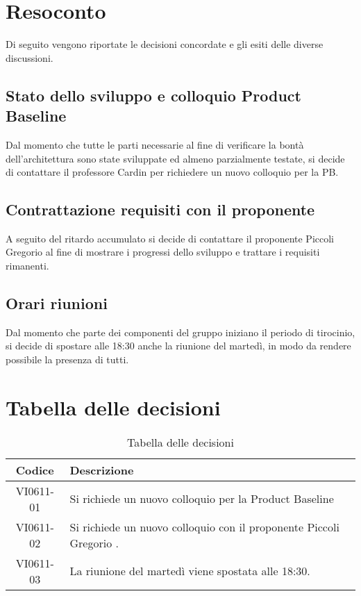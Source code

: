 \documentclass{article}
\begin{document}
\newpage
\section{Resoconto}
\label{sec:resoconto}

Di seguito vengono riportate le decisioni concordate e gli esiti delle diverse discussioni.

\subsection{Stato dello sviluppo e colloquio Product Baseline}
\label{itm:1}
Dal momento che tutte le parti necessarie al fine di verificare la bontà dell'architettura sono state sviluppate ed almeno parzialmente testate, si decide di contattare il professore Cardin per richiedere un nuovo colloquio per la PB.

\subsection{Contrattazione requisiti con il proponente}
\label{itm:2}
A seguito del ritardo accumulato si decide di contattare il proponente Piccoli Gregorio al fine di mostrare i progressi dello sviluppo e trattare i requisiti rimanenti.

\subsection{Orari riunioni}
\label{itm:3}
Dal momento che parte dei componenti del gruppo iniziano il periodo di tirocinio, si decide di spostare alle 18:30 anche la riunione del martedì, in modo da rendere possibile la presenza di tutti.


\section{Tabella delle decisioni}%
\label{sub:decisioni}

\begin{table}[!ht]
	\centering
	\begin{tabular}{|c|p{13cm}|}
		\hline
		\rowcolor{lightgray}
		\textbf{Codice} & \textbf{Descrizione} \\
		\hline
			VI0611-01 & Si richiede un nuovo colloquio per la Product Baseline \\
            VI0611-02 & Si richiede un nuovo colloquio con il proponente Piccoli Gregorio .\\
			VI0611-03 & La riunione del martedì viene spostata alle 18:30. \\
		\hline
	\end{tabular}
	\caption{Tabella delle decisioni}
\end{table}
\end{document}
